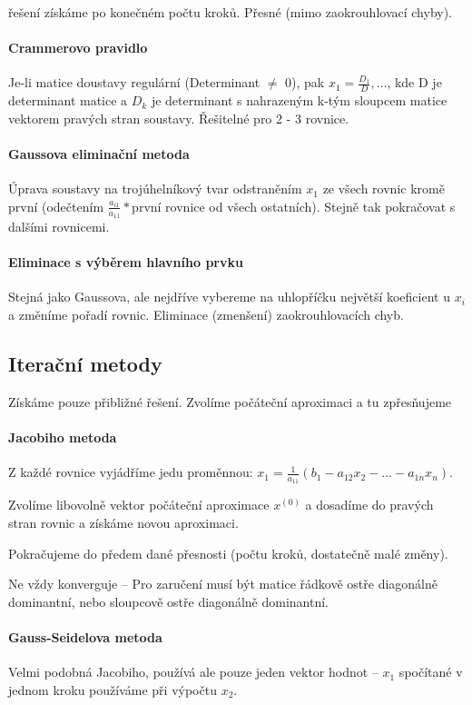 \documentclass[a4paper, 11pt]{report}
\begin{document}
řešení získáme po konečném počtu kroků. Přesné (mimo zaokrouhlovací chyby).

\paragraph{Crammerovo pravidlo}
Je-li matice doustavy regulární (Determinant $\neq$ 0), pak $x_1 = \frac{D_1}{D}, \dots$, kde D je determinant matice a $D_k$ je determinant s nahrazeným k-tým sloupcem matice vektorem pravých stran soustavy. Řešitelné pro 2 - 3 rovnice.

\paragraph{Gaussova eliminační metoda}
Úprava soustavy na trojúhelníkový tvar odstraněním $x_1$ ze všech rovnic kromě první (odečtením $\frac{a_{i1}}{a_{11}}*$první rovnice od všech ostatních). Stejně tak pokračovat s dalšími rovnicemi.

\paragraph{Eliminace s výběrem hlavního prvku}
Stejná jako Gaussova, ale nejdříve vybereme na uhlopříčku největší koeficient u $x_i$ a změníme pořadí rovnic. Eliminace (zmenšení) zaokrouhlovacích chyb.

\subsection{Iterační metody}
Získáme pouze přibližné řešení. Zvolíme počáteční aproximaci a tu zpřesňujeme

\paragraph{Jacobiho metoda}
Z každé rovnice vyjádříme jedu proměnnou: $x_1 = \frac{1}{a_{11}} \left( b_1 - a_{12}x_2 - \dots - a_{1n}x_n \right)$.

Zvolíme libovolně vektor počáteční aproximace $x^{(0)}$ a dosadíme do pravých stran rovnic a získáme novou aproximaci.

Pokračujeme do předem dané přesnosti (počtu kroků, dostatečně malé změny).

Ne vždy konverguje -- Pro zaručení musí být matice řádkově ostře diagonálně dominantní, nebo sloupcově ostře diagonálně dominantní.

\paragraph{Gauss-Seidelova metoda}
Velmi podobná Jacobiho, používá ale pouze jeden vektor hodnot -- $x_1$ spočítané v jednom kroku používáme při výpočtu $x_2$.
\end{document}

